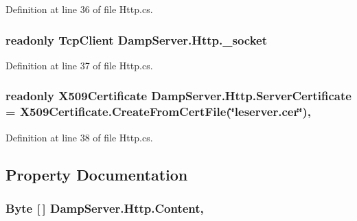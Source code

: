 Definition at line 36 of file Http.\-cs.

\hypertarget{class_damp_server_1_1_http_a71888e437700b492e514a4cbe623d428}{
\subsubsection[{\-\_\-socket}]{\setlength{\rightskip}{0pt plus 5cm}readonly Tcp\-Client Damp\-Server.\-Http.\-\_\-socket\hspace{0.3cm}{\ttfamily [private]}}}\label{class_damp_server_1_1_http_a71888e437700b492e514a4cbe623d428}


Definition at line 37 of file Http.\-cs.

\hypertarget{class_damp_server_1_1_http_a76555ab9a02fa95b58c8fc4eb60d933f}{
\subsubsection[{Server\-Certificate}]{\setlength{\rightskip}{0pt plus 5cm}readonly X509\-Certificate Damp\-Server.\-Http.\-Server\-Certificate = X509\-Certificate.\-Create\-From\-Cert\-File(\char`\"{}leserver.\-cer\char`\"{})\hspace{0.3cm}{\ttfamily [static]}, {\ttfamily [private]}}}\label{class_damp_server_1_1_http_a76555ab9a02fa95b58c8fc4eb60d933f}


Definition at line 38 of file Http.\-cs.



\subsection{Property Documentation}
\hypertarget{class_damp_server_1_1_http_a5eff225d340daeda680441cd92718235}{
\subsubsection[{Content}]{\setlength{\rightskip}{0pt plus 5cm}Byte \mbox{[}$\,$\mbox{]} Damp\-Server.\-Http.\-Content\hspace{0.3cm}{\ttfamily [get]}, {\ttfamily [set]}}}\label{class_damp_server_1_1_http_a5eff225d340daeda680441cd92718235}


